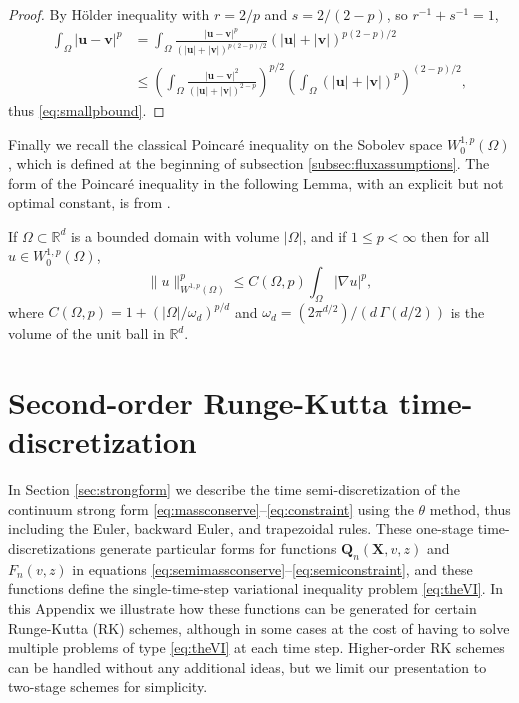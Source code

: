 \documentclass[final,leqno,onefignum,onetabnum]{siamltex1213bueler}
\newcommand\bu{\mathbf{u}}
\newcommand\bv{\mathbf{v}}
\newcommand\bQ{\mathbf{Q}}
\newcommand\bX{\mathbf{X}}
\renewcommand{\grad}{\nabla}
\newcommand\RR{\mathbb{R}}
\begin{document}
\begin{proof}  By H\"older inequality with $r=2/p$ and $s=2/(2-p)$, so $r^{-1}+s^{-1}=1$,
\begin{align*}
\int_\Omega |\bu - \bv|^p &= \int_\Omega \frac{|\bu-\bv|^p}{\left(|\bu|+|\bv|\right)^{p(2-p)/2}} \left(|\bu|+|\bv|\right)^{p(2-p)/2} \\
    &\le \left(\int_\Omega \frac{|\bu-\bv|^2}{\left(|\bu|+|\bv|\right)^{2-p}}\right)^{p/2} \left(\int_\Omega \left(|\bu|+|\bv|\right)^p\right)^{(2-p)/2},
\end{align*}
thus \eqref{eq:smallpbound}.
\end{proof}

Finally we recall the classical Poincar\'e inequality on the Sobolev space $W_0^{1,p}(\Omega)$, which is defined at the beginning of subsection \ref{subsec:fluxassumptions}.  The form of the Poincar\'e inequality in the following Lemma, with an explicit but not optimal constant, is from \cite[section 7.8]{GilbargTrudinger2001}.

\begin{lemma} \label{lem:poincare}  If $\Omega\subset \RR^d$ is a bounded domain with volume $|\Omega|$, and if $1\le p<\infty$ then for all $u\in W_0^{1,p}(\Omega)$,
\begin{equation}
  \|u\|_{W^{1,p}(\Omega)}^p \le C(\Omega,p) \int_\Omega |\grad u|^p, \label{eq:poincare}
\end{equation}
where $C(\Omega,p)=1+(|\Omega|/\omega_d)^{p/d}$ and $\omega_d=(2 \pi^{d/2})/(d\,\Gamma(d/2))$ is the volume of the unit ball in $\RR^d$.
\end{lemma}


\section{Second-order Runge-Kutta time-discretization}   \label{app:rk2}  In Section \ref{sec:strongform} we describe the time semi-discretization of the continuum strong form \eqref{eq:massconserve}--\eqref{eq:constraint} using the $\theta$ method, thus including the Euler, backward Euler, and trapezoidal rules.  These one-stage time-discretizations generate particular forms for functions $\bQ_n(\bX,v,z)$ and $F_n(v,z)$ in equations \eqref{eq:semimassconserve}--\eqref{eq:semiconstraint}, and these functions define the single-time-step variational inequality problem \eqref{eq:theVI}.  In this Appendix we illustrate how these functions can be generated for certain Runge-Kutta (RK) schemes, although in some cases at the cost of having to solve multiple problems of type \eqref{eq:theVI} at each time step.  Higher-order RK schemes can be handled without any additional ideas, but we limit our presentation to two-stage schemes for simplicity.
\end{document}
